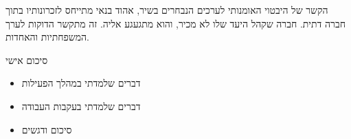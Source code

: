 \documentclass[]{beamer}
\begin{document}
    \begin{frame}{הקשר של היבטוי האומנותי לערכים הנבחרים}
        בשיר, אהוד בנאי מתייחס לזכרונותיו בתוך חברה דתית. חברה שקהל היעד שלו לא מכיר, והוא מתגעגע אליה. זה מתקשר הדוקות לערך המשפחתיות והאחדות. 
    \end{frame}
    
    \begin{frame}{סיכום אישי}
        \begin{itemize}
            \item דברים שלמדתי במהלך הפעילות
            \item דברים שלמדתי בעקבות העבודה
            \item סיכום ודגשים
        \end{itemize}
    \end{frame}
    
\end{document}

